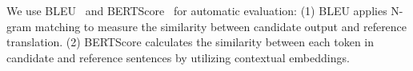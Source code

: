 We use BLEU~\cite{DBLP:conf/acl/PapineniRWZ02} and BERTScore~\cite{DBLP:conf/iclr/ZhangKWWA20} for automatic evaluation: (1) BLEU applies N-gram matching to measure the similarity between candidate output and reference translation. (2) BERTScore calculates the similarity between each token in candidate and reference sentences by utilizing contextual embeddings. %

